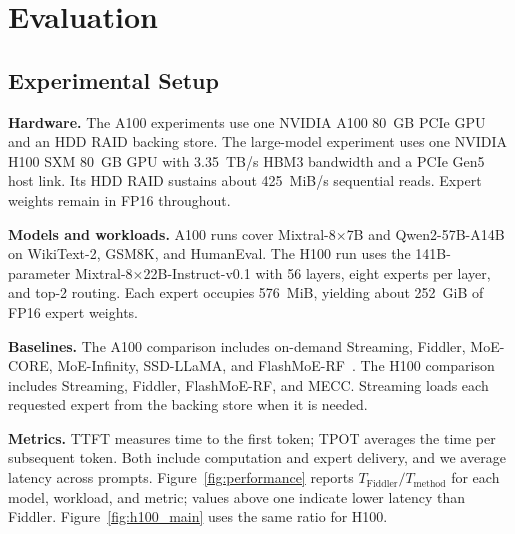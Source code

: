 \section{Evaluation}
\label{sec:evaluation}
\raggedbottom




\subsection{Experimental Setup}
\textbf{Hardware.}
The A100 experiments use one NVIDIA A100 80~GB PCIe GPU and an HDD RAID backing store.
The large-model experiment uses one NVIDIA H100 SXM 80~GB GPU with 3.35~TB/s HBM3 bandwidth and a PCIe Gen5 host link.
Its HDD RAID sustains about 425~MiB/s sequential reads.
Expert weights remain in FP16 throughout.

\textbf{Models and workloads.}
A100 runs cover Mixtral-8$\times$7B and Qwen2-57B-A14B on WikiText-2, GSM8K, and HumanEval.
The H100 run uses the 141B-parameter Mixtral-8$\times$22B-Instruct-v0.1 with 56 layers, eight experts per layer, and top-2 routing.
Each expert occupies 576~MiB, yielding about 252~GiB of FP16 expert weights.

\textbf{Baselines.}
The A100 comparison includes on-demand Streaming, Fiddler, MoE-CORE, MoE-Infinity, SSD-LLaMA, and FlashMoE-RF~\cite{fiddler,core,moeinfinity,ssdllama,flashmoe}.
The H100 comparison includes Streaming, Fiddler, FlashMoE-RF, and MECC.
Streaming loads each requested expert from the backing store when it is needed.

\textbf{Metrics.}
TTFT measures time to the first token; TPOT averages the time per subsequent token.
Both include computation and expert delivery, and we average latency across prompts.
Figure~\ref{fig:performance} reports $T_{\mathrm{Fiddler}}/T_{\mathrm{method}}$ for each model, workload, and metric; values above one indicate lower latency than Fiddler.
Figure~\ref{fig:h100_main} uses the same ratio for H100.

